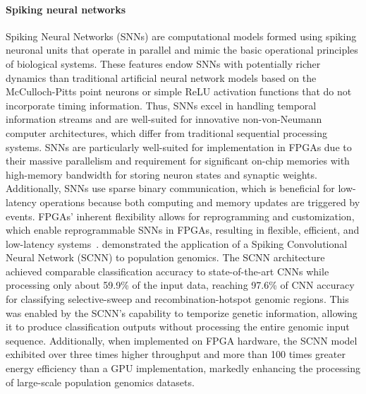 \paragraph{Spiking neural networks} Spiking Neural Networks (SNNs) are computational models formed using spiking neuronal units that operate in parallel and mimic the basic operational principles of biological systems. These features endow SNNs with potentially richer dynamics than traditional artificial neural network models based on the McCulloch-Pitts point neurons or simple ReLU activation functions that do not incorporate timing information. Thus, SNNs excel in handling temporal information streams and are well-suited for innovative non-von-Neumann computer architectures, which differ from traditional sequential processing systems. SNNs are particularly well-suited for implementation in FPGAs due to their massive parallelism and requirement for significant on-chip memories with high-memory bandwidth for storing neuron states and synaptic weights. Additionally, SNNs use sparse binary communication, which is beneficial for low-latency operations because both computing and memory updates are triggered by events. FPGAs' inherent flexibility allows for reprogramming and customization, which enable reprogrammable SNNs in FPGAs, resulting in flexible, efficient, and low-latency systems~\cite{Corradi2021Gyro:Analytics,Irmak2021ADesigns,SankaranAnInference}. \citet{corradi2024accelerated} demonstrated the application of a Spiking Convolutional Neural Network (SCNN) to population genomics. The SCNN architecture achieved comparable classification accuracy to state-of-the-art CNNs while processing only about 59.9\% of the input data, reaching 97.6\% of CNN accuracy for classifying selective-sweep and recombination-hotspot genomic regions. This was enabled by %
the SCNN's capability to temporize genetic information, allowing it to produce classification outputs without processing the entire genomic input sequence. Additionally, when implemented on FPGA hardware, the SCNN model exhibited over three times higher throughput and more than 100 times greater energy efficiency than a GPU implementation, markedly enhancing the processing of large-scale population genomics datasets.


